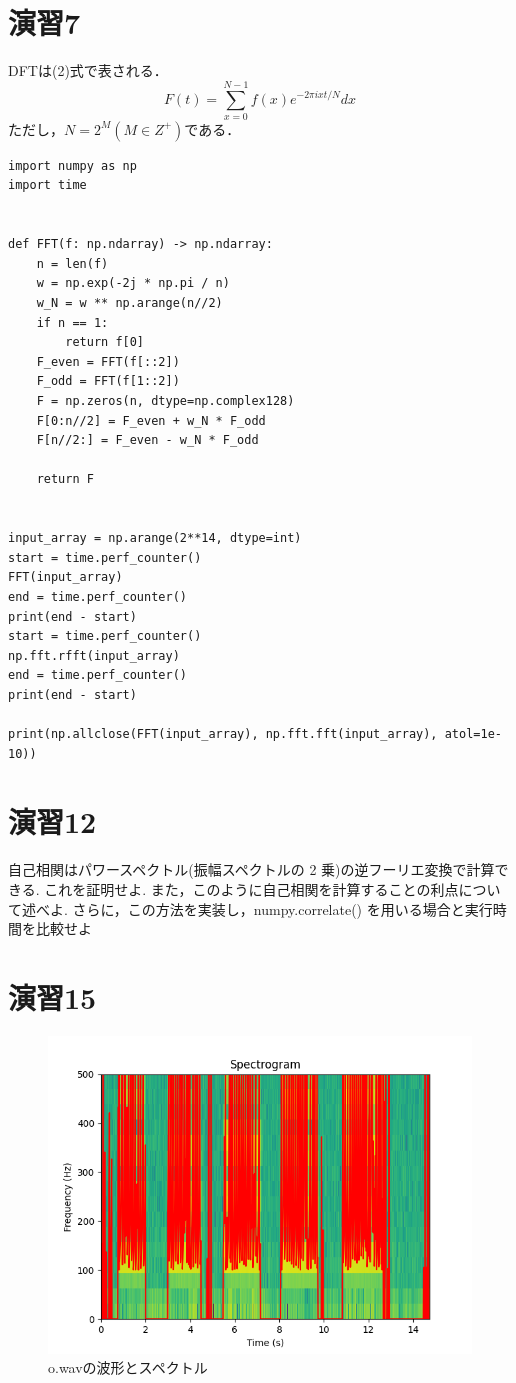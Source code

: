 \documentclass[11pt,a4j]{jarticle}%
\begin{document}
\section{演習7}
DFTは(2)式で表される．
\begin{equation}
  F(t) = \sum_{x=0}^{N-1} f(x)e^{-2\pi ixt/N}dx
\end{equation}
ただし，$N=2^M(M\in Z^+)$である．
\begin{lstlisting}[caption=FFT実装,label=prog1]
import numpy as np
import time


def FFT(f: np.ndarray) -> np.ndarray:
    n = len(f)
    w = np.exp(-2j * np.pi / n)
    w_N = w ** np.arange(n//2)
    if n == 1:
        return f[0]
    F_even = FFT(f[::2])
    F_odd = FFT(f[1::2])
    F = np.zeros(n, dtype=np.complex128)
    F[0:n//2] = F_even + w_N * F_odd
    F[n//2:] = F_even - w_N * F_odd

    return F


input_array = np.arange(2**14, dtype=int)
start = time.perf_counter()
FFT(input_array)
end = time.perf_counter()
print(end - start)
start = time.perf_counter()
np.fft.rfft(input_array)
end = time.perf_counter()
print(end - start)

print(np.allclose(FFT(input_array), np.fft.fft(input_array), atol=1e-10))
\end{lstlisting}

\section{演習12}
自己相関はパワースペクトル(振幅スペクトルの 2 乗)の逆フーリエ変換で計算できる. これを証明せよ.
また，このように自己相関を計算することの利点について述べよ.
さらに，この方法を実装し，numpy.correlate() を用いる場合と実行時間を比較せよ

\section*{演習15}
\begin{figure}[H]
  \centering
  \includegraphics[width=120mm]{img/aiueo2-plot-spectrum-and-fundamental.png}
  \caption{o.wavの波形とスペクトル}
\end{figure}
\end{document}
